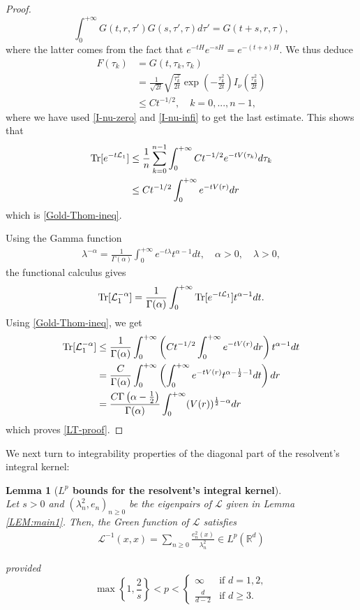 \documentclass[%
11pt,  reqno]{amsart}
\newtheorem{lemma}[theorem]{Lemma}
\theoremstyle{remarkstyle}
\newcommand{\1}{\hspace{0.2mm}\text{I}\hspace{0.2mm}}
\newcommand{\noi}{\noindent}
\newcommand{\R}{\mathbb{R}}
\renewcommand{\L}{\mathcal{L}}
\newcommand{\al}{\alpha}
\newcommand{\ld}{\lambda}
\numberwithin{equation}{section}
\numberwithin{theorem}{section}
\begin{document}
\begin{proof}
		\[
		\int_0^{+\infty} G(t,r,\tau') G(s,\tau',\tau)d\tau' = G(t+s, r, \tau),
		\]
		where the latter comes from the fact that $e^{-tH} e^{-sH} = e^{-(t+s)H}$. We thus deduce
		\begin{align*}
			F(\tau_k)&= G(t,\tau_k, \tau_k) \\
			&= \frac{1}{\sqrt{2t}} \sqrt{\frac{\tau_k^2}{2t}} \exp\left(-\frac{\tau_k^2}{2t}\right) I_\nu\left(\frac{\tau_k^2}{2t}\right) \\
			&\leq Ct^{-1/2}, \quad k=0,..., n-1,
		\end{align*}
		where we have used \eqref{I-nu-zero} and \eqref{I-nu-infi} to get the last estimate. This shows that
		\begin{align*}
			{\rm Tr}[e^{-t\L_1}] &\leq \frac{1}{n} \sum_{k=0}^{n-1} \int_0^{+\infty} Ct^{-1/2} e^{-tV(\tau_k)} d\tau_k \\
			&\leq C t^{-1/2} \int_0^{+\infty} e^{-tV(r)}dr
		\end{align*}
		which is \eqref{Gold-Thom-ineq}.	
		
		 Using the Gamma function
		\begin{align}\label{Gamma}
			\lambda^{-\alpha} = \frac{1}{\Gamma(\alpha)} \int_0^{+\infty} e^{-t\lambda} t^{\alpha-1} dt, \quad \alpha>0, \quad \lambda>0,
		\end{align}
		the functional calculus gives
		\[
		{\rm Tr}[\L_1^{-\al}] =\frac{1}{\Gamma(\al)} \int_0^{+\infty} {\rm Tr}[e^{-t\L_1}] t^{\al-1} dt.
		\]
		Using \eqref{Gold-Thom-ineq}, we get
		\begin{align*}
			{\rm Tr}[\L_1^{-\al}] &\leq \frac{1}{\Gamma(\al)}  \int_0^{+\infty} \left( Ct^{-1/2} \int_0^{+\infty} e^{-tV(r)} dr\right) t^{\al-1} dt \\
			&= \frac{C}{\Gamma(\al)} \int_0^{+\infty} \left(\int_0^{+\infty} e^{-tV(r)} t^{\al-\frac{1}{2}-1} dt\right) dr \\
			&= \frac{C \Gamma\left(\al-\frac{1}{2}\right)}{\Gamma(\al)} \int_0^{+\infty} (V(r))^{\frac{1}{2}-\al} dr
		\end{align*}
		which proves \eqref{LT-proof}. 
	\end{proof}
	
	We next turn to integrability properties of the diagonal part of the resolvent's integral kernel:
	
	\begin{lemma}[\textbf{$L^p$ bounds for the resolvent's integral kernel}]\label{LEM:main3}\mbox{}\\
		Let $s>0$ and $(\ld_n^2,e_n)_{n\ge 0}$ be the eigenpairs of $\L$ given in Lemma \ref{LEM:main1}. Then, the Green function of $\L$ satisfies
		\begin{align}
			\label{GreenEst}
			\L^{-1} (x,x) = \sum_{n\ge 0} \frac{e^2_n(x)}{\ld_n^2} \in L^p(\R^d)
		\end{align}
		
		\noi 
		provided 
		$$
		\max\left\{1,\frac2s\right\} < p < 
		\begin{cases}
			\infty &\text{if } d=1,2, \\
			\frac{d}{d-2} &\text{if } d\geq 3.	
		\end{cases}
		$$	
	\end{lemma}
	
\end{document}
